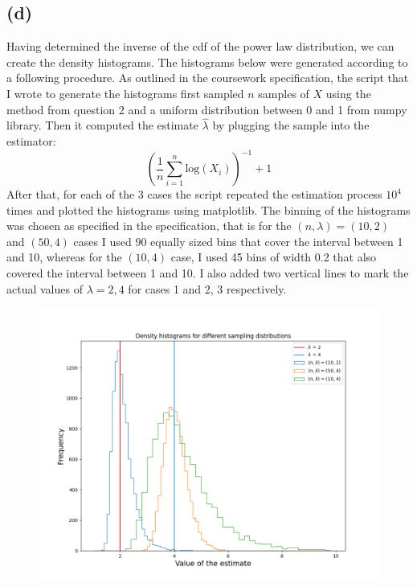 \documentclass[12pt]{article}
\begin{document}
\subsection*{(d)}
Having determined the inverse of the cdf of the power law distribution, we can create the density histograms. 
The histograms below were generated according to a following procedure. As outlined in the coursework specification, the script that I wrote to generate the histograms first sampled $ n $ samples of $ X $ using the method from question 2 and a uniform distribution between 0 and 1 from numpy library. 
Then it computed the estimate $ \hat{\lambda}$ by plugging the sample into the estimator:
\[  \left(\frac{1}{n} \sum_{i = 1}^{n} \text{log} (X_i) \right)^{-1} + 1  \]
After that, for each of the 3 cases the script repeated the estimation process $ 10^4 $ times and plotted the histograms using matplotlib. 
The binning of the histograms was chosen as specified in the specification, 
that is for the $ (n, \lambda) = (10, 2) $ and $ (50,4)$ cases I used 90 equally sized bins that cover the interval between 1 and 10, whereas for the $(10, 4)$ case, I used 45 bins of width 0.2 that also covered the interval between 1 and 10. I also added two vertical lines to mark the actual values of $\lambda = 2, \text{4}$ for cases 1 and 2, 3 respectively.

\begin{figure}[H]
  \begin{center}
    \includegraphics[scale=0.7]{plot3.png}
  \end{center}
\end{figure}
\end{document}
